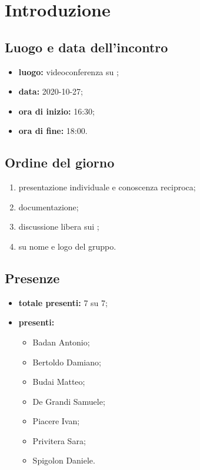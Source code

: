 \section*{Introduzione}

\subsection*{Luogo e data dell'incontro}
\begin{itemize}
	\item \textbf{luogo:} videoconferenza su ;
	\item \textbf{data:} 2020-10-27;
	\item \textbf{ora di inizio:} 16:30;
	\item \textbf{ora di fine:} 18:00.
\end{itemize}

\subsection*{Ordine del giorno}
\begin{enumerate}
\item presentazione individuale e conoscenza reciproca;
\item documentazione;
\item discussione libera sui ;
\item {} su nome e logo del gruppo.
\end{enumerate}

\subsection*{Presenze}
	\begin{itemize}
		\item \textbf{totale presenti:} 7 su 7;
		\item \textbf{presenti: }
			\begin{itemize}
				\item Badan Antonio;
				\item Bertoldo Damiano;
				\item Budai Matteo;
				\item De Grandi Samuele;
				\item Piacere Ivan;
				\item Privitera Sara;
				\item Spigolon Daniele.
			\end{itemize}
	\end{itemize}


